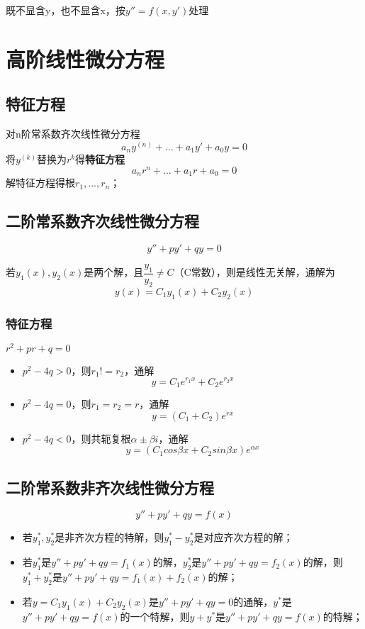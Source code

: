 既不显含y，也不显含x，按\(y'' = f(x, y')\)处理


\section{高阶线性微分方程}

\subsection{特征方程}
对n阶常系数齐次线性微分方程\[a_ny^{(n)} + ... + a_1y' + a_0y = 0\]
将\(y^{(k)}\)替换为\(r^k\)得\textbf{特征方程}\[a_nr^n + ... + a_1r + a_0 = 0\]
解特征方程得根\(r_1, ..., r_n\)；


\subsection{二阶常系数齐次线性微分方程}
\[y'' + py' + qy = 0\]

若\(y_1(x),y_2(x)\)是两个解，且\(\dfrac{y_1}{y_2} \neq C\)（C常数），则是线性无关解，通解为\[y(x) = C_1y_1(x) + C_2y_2(x)\]

\subsubsection{特征方程}
\(r^2 + pr + q = 0\)
\begin{itemize}
    \item \(p^2 - 4q > 0\)，则\(r_1 != r_2\)，通解\[y = C_1e^{r_1x} + C_2e^{r_2x}\]
    \item \(p^2 - 4q = 0\)，则\(r_1 = r_2 = r\)，通解\[y = (C_1 + C_2)e^{rx}\]
    \item \(p^2 - 4q < 0\)，则共轭复根\(\alpha \pm \beta i\)，通解\[y = (C_1cos\beta x + C_2sin\beta x)e^{\alpha x}\]
\end{itemize}


\subsection{二阶常系数非齐次线性微分方程}
\[y'' + py' + qy = f(x)\]
\begin{itemize}
    \item 若\(y_1^*, y_2^*\)是非齐次方程的特解，则\(y_1^* - y_2^*\)是对应齐次方程的解；

    \item 若\(y_1^*\)是\(y'' + py' + qy = f_1(x)\)的解，\(y_2^*\)是\(y'' + py' + qy = f_2(x)\)的解，则\(y_1^* + y_2^*\)是\(y'' + py' + qy = f_1(x) + f_2(x)\)的解；

    \item 若\(y = C_1y_1(x) + C_2y_2(x)\)是\(y'' + py' + qy = 0\)的通解，\(y^*\)是\(y'' + py' + qy = f(x)\)的一个特解，则\(y + y^*\)是\(y'' + py' + qy = f(x)\)的特解；
\end{itemize}

